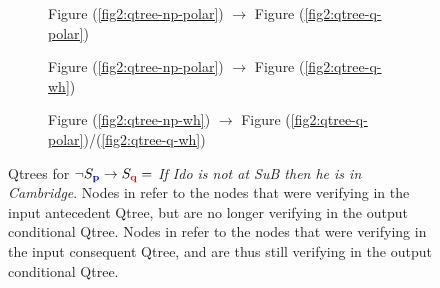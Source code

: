 \begin{figure}[H]
	\centering
	\begin{subfigure}[b]{.3\linewidth}
		\centering
		\caption{Figure (\ref{fig2:qtree-np-polar}) $\rightarrow$ Figure (\ref{fig2:qtree-q-polar})}\label{fig2:qtree-nptq-polar-polar}
	\end{subfigure}\hfill
	\begin{subfigure}[b]{.3\linewidth}
		\centering
		\caption{Figure (\ref{fig2:qtree-np-polar}) $\rightarrow$ Figure (\ref{fig2:qtree-q-wh})}\label{fig2:qtree-nptq-polar-wh}
	\end{subfigure}\hfill
	\begin{subfigure}[b]{.3\linewidth}
		\centering
		\scalebox{1}{
			\begin{forest}
				[CS [{$\p$}][\fbox{$\q$}][\dbox{$\r$}][\dbox{...}]]
			\end{forest}
		}
		\caption{Figure (\ref{fig2:qtree-np-wh}) $\rightarrow$ Figure (\ref{fig2:qtree-q-polar})/(\ref{fig2:qtree-q-wh})\footnotemark}\label{fig2:qtree-nptq-wh}
	\end{subfigure}
	\caption[]{Qtrees for $\neg S\protect_{\textbf{\textcolor{blue}{p}}} \rightarrow S\protect_{\textbf{\textcolor{red}{q}}} =$ \textit{If Ido is not at SuB then he is in Cambridge}. Nodes in \setlength{\fboxsep}{1pt} refer to the nodes that were verifying in the input antecedent Qtree, but are no longer verifying in the output conditional Qtree. Nodes in \setlength{\fboxsep}{1pt} refer to the nodes that were verifying in the input consequent Qtree, and are thus still verifying in the output conditional Qtree.}
	\label{fig2:qtrees-nptq}
\end{figure}
\label{fn:qtree-reduc}

